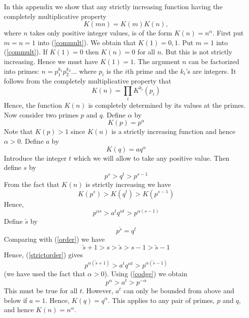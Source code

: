 \documentclass[10pt,twocolumn]{article}
\begin{document}
In this appendix we show that any strictly increasing function having
the completely multiplicative property
\begin{equation}\label{commult}
K(mn)=K(m)K(n),
\end{equation}
where $n$ takes only positive integer values,
is of the form $K(n)=n^\alpha$.  First put $m=n=1$ into
(\ref{commult}). We obtain that $K(1)=0,1$. Put $m=1$ into
(\ref{commult}). If $K(1)=0$ then $K(n)=0$ for all $n$. But this is not
strictly increasing.  Hence we must have $K(1)=1$. The argument $n$ can
be factorized into primes: $n=p_1^{k_1}p_2^{k_2}\dots$ where $p_i$ is
the $i$th prime and the $k_i$'s are integers. It follows from the
completely multiplicative property that
\begin{equation}
K(n)=\prod_i K^{k_i}(p_i)
\end{equation}
Hence, the function $K(n)$ is completely determined by its values at the
primes.  Now consider two primes $p$ and $q$.  Define $\alpha$ by
\begin{equation}
K(p)=p^\alpha
\end{equation}
Note that $K(p)>1$ since $K(n)$ is a strictly increasing function and
hence $\alpha>0$.
Define $a$ by
\begin{equation}
K(q)=aq^\alpha
\end{equation}
Introduce the integer $t$ which we will allow to take any positive
value. Then define $s$ by
\begin{equation}\label{order}
p^s> q^t > p^{s-1}
\end{equation}
From the fact that $K(n)$ is strictly increasing we have
\begin{equation}
K(p^s)> K(q^t) > K(p^{s-1})
\end{equation}
Hence,
\begin{equation}\label{strictorder}
p^{\alpha s} > a^t q^{\alpha t} > p^{\alpha (s-1)}
\end{equation}
Define $\widetilde{s}$ by
\begin{equation}\label{codge}
p^{\widetilde{s}} = q^t
\end{equation}
Comparing with (\ref{order}) we have
\begin{equation}
\widetilde{s}+1 > s>\widetilde{s}> s-1>\widetilde{s}-1
\end{equation}
Hence, (\ref{strictorder}) gives
\begin{equation}
p^{\alpha (\widetilde{s}+1)} > a^t q^{\alpha t} >
p^{\alpha (\widetilde{s}-1)}
\end{equation}
(we have used the fact that $\alpha>0$).
Using (\ref{codge}) we obtain
\begin{equation}
p^\alpha > a^t > p^{-\alpha}
\end{equation}
This must be true for all $t$.  However, $a^t$ can only be bounded from
above and below if $a=1$.  Hence, $K(q)=q^\alpha$.  This applies to any
pair of primes, $p$ and $q$, and hence $K(n)=n^\alpha$.
\end{document}
